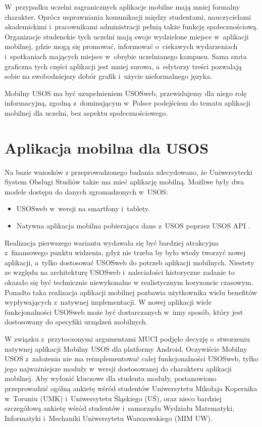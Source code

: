 \documentclass{pracamgr}
\begin{document}
W~przypadku uczelni zagranicznych aplikacje mobilne mają mniej formalny
charakter. Oprócz usprawniania komunikacji między studentami, nauczycielami
akademickimi i~pracownikami administracji pełnią także funkcję społecznościową.
Organizacje studenckie tych uczelni mają swoje wydzielone miejsce w~aplikacji
mobilnej, gdzie mogą się promować, informować o~ciekawych wydarzeniach i~spotkaniach
mających miejsce w~obrębie uczelnianego kampusu. Sama szata graficzna tych części
aplikacji jest mniej surowa, a~edytorzy treści pozwalają sobie na
swobodniejszy dobór grafik i~użycie nieformalnego języka. 

Mobilny USOS ma być uzupełnieniem USOSweb, przewidujemy dla niego rolę informacyjną,
zgodną z~dominującym w~Polsce podejściem do tematu aplikacji mobilnej dla uczelni,
bez aspektu społecznościowego.

\section{Aplikacja mobilna dla USOS}

Na bazie wniosków z przeprowadzonego badania zdecydowano, że Uniwersytecki
System Obsługi Studiów także ma mieć aplikację mobilną. Możliwe były dwa
modele dostępu do danych zgromadzonych w~USOS:

\begin{itemize}
	\item USOSweb w~wersji na smartfony i~tablety.
	\item Natywna aplikacja mobilna pobierająca dane z~USOS poprzez USOS API \cite{usosapi}.
\end{itemize}

Realizacja pierwszego wariantu wydawała się być bardziej atrakcyjna z~finansowego
punktu widzenia, gdyż nie trzeba by było wtedy tworzyć nowej aplikacji, a~tylko
dostosować USOSweb do potrzeb aplikacji mobilnych. Niestety ze względu na architekturę
USOSweb i~naleciałości historyczne zadanie to okazało się być technicznie niewykonalne
w realistycznym horyzoncie czasowym. Ponadto taka realizacja aplikacji mobilnej
pozbawia użytkownika wielu benefitów wypływających z~natywnej implementacji.
W nowej aplikacji wiele funkcjonalności USOSweb może być dostarczanych w~inny
sposób, który jest dostosowany do specyfiki urządzeń mobilnych.

W związku z~przytoczonymi argumentami MUCI podjęło decyzję o~stworzeniu natywnej
aplikacji Mobilny USOS dla platformy Android. Oczywiście Mobilny USOS z~założenia
nie ma reimplementować całej funkcjonalności USOSweb, tylko jego najważniejsze
moduły w~wersji dostosowanej do charakteru aplikacji mobilnej.
Aby wyłonić kluczowe dla studenta moduły, postanowiono przeprowadzić
ogólną ankietę wśród studentów Uniwersytetu Mikołaja Kopernika w~Toruniu (UMK) i~Uniwersytetu
Śląskiego (UŚ), oraz nieco bardziej szczegółową ankietę wśród studentów i~samorządu
Wydziału Matematyki, Informatyki i~Mechaniki Uniwersytetu Warszawskiego (MIM UW).
\end{document}
